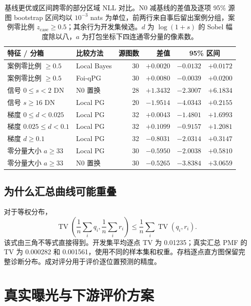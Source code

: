 \documentclass[10pt,twocolumn,journal]{IEEEtran}
\DeclareMathOperator{\TV}{TV}
\begin{document}
\begin{table}[t]
\centering
\caption{基线更优或区间跨零的部分区域 NLL 对比。N0 减基线的差值及逐项 95\% 源图 bootstrap 区间均以 $10^{-3}$ nats 为单位，前两行来自事后留出案例分组，案例零比例 $z_{\mathrm{case}}\geq0.5$；其余行为开发集候选。$d$ 为 $\log(1+s)$ 的 Sobel 幅度除以八，$a$ 为打包坐标下四连通零分量的像素数。}
\label{tab:adverse}
\begin{tabular}{@{}llrrrr@{}}
\toprule
特征 / 分箱 & 比较方法 & 源图数 & 差值 & \multicolumn{2}{c}{95\% 区间}\\
\midrule
案例零比例 $\geq0.5$ & Local Bayes & 30 & $+0.0020$ & $-0.0132$ & $+0.0172$\\
案例零比例 $\geq0.5$ & Foi-qPG & 30 & $+0.0080$ & $-0.0039$ & $+0.0200$\\
信号 $0\leq s<2$ DN & N0 置换 & 28 & $+1.3432$ & $-2.3007$ & $+6.1834$\\
信号 $s\geq16$ DN & Local PG & 20 & $-1.9514$ & $-4.0343$ & $+0.2155$\\
梯度 $0\leq d<0.025$ & Local PG & 32 & $+0.0043$ & $-1.4801$ & $+1.6993$\\
梯度 $0.025\leq d<0.1$ & Local PG & 32 & $+0.1099$ & $-0.9157$ & $+1.2081$\\
梯度 $d\geq0.1$ & Local PG & 32 & $-0.8031$ & $-2.0314$ & $+0.3147$\\
零分量大小 $a\geq33$ & Local PG & 30 & $-0.5950$ & $-2.0038$ & $+0.5810$\\
零分量大小 $a\geq33$ & N0 置换 & 30 & $-0.5265$ & $-3.8384$ & $+3.0659$\\
\bottomrule
\end{tabular}
\end{table}

\subsection{为什么汇总曲线可能重叠}
对于等权分布，
\begin{equation}
\TV\!\left(\frac1n\sum_iq_i,\frac1n\sum_ir_i\right)
\leq\frac1n\sum_i\TV(q_i,r_i).
\end{equation}
该式由三角不等式直接得到。开发集平均逐点 TV 为 0.01235；真实汇总 PMF 的 TV 为 0.000282 和 0.001561，使用不同的样本集和权重。存档逐点直方图保留完整诊断分布。成对评分用于评价逐位置预测的精度。

\section{真实曝光与下游评价方案}
\end{document}
